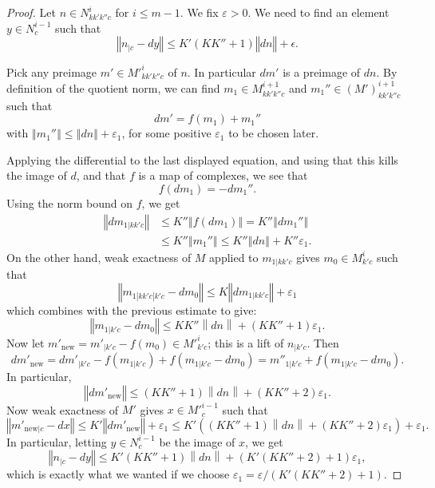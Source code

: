 \begin{proof}
\leanok
\def\ndn{\left\|dn\right\|}
Let $n \in N^i_{kk'k''c}$ for $i\leq m-1$.
We fix $ε > 0$. We need to find an element $y \in N^{i-1}_c$ such that
\[
  ‖n_{|c} - dy‖ \leq K'(KK'' + 1)‖dn‖ + \epsilon.
\]

Pick any preimage $m' \in M'^i_{kk'k''c}$ of $n$. In particular $dm'$ is
a preimage of $dn$.
By definition of the quotient norm,
we can find $m_1 ∈ M^{i+1}_{kk'k''c}$ and $m_1'' ∈ (M')^{i+1}_{kk'k''c}$ such that
\[
dm' = f(m_1) + m_1''
\]
with $‖m_1''‖ \leq ‖dn‖ + ε_1$, for some positive $ε_1$ to be chosen later.

Applying the differential to the last displayed equation, and using that this
kills the image of $d$, and that $f$ is a map of complexes, we see that
\[
f(dm_1) = -dm_1''.
\]
Using the norm bound on $f$, we get
\[\begin{aligned}
  ‖dm_{1|kk'c}‖ &≤ K''‖f(dm_1)‖ = K''‖dm_1''‖\\
                &≤ K''‖m_1''‖ ≤ K''‖dn‖ + K''ε_1.
\end{aligned}\]
On the other hand, weak exactness of $M$ applied to $m_{1|kk'c}$
gives $m_0 ∈ M^i_{k'c}$ such that
\[
  ‖m_{1|kk'c|k'c} - dm_0‖ \leq K‖dm_{1|kk'c}‖ + ε_1
\]
which combines with the previous estimate to give:
\[
  ‖m_{1|k'c} - dm_0‖ \leq K K'' \left\|d n\right\| + (KK'' + 1)ε_1.
\]
Now let $m'_{\mathrm{new}} = m'_{|k'c} - f(m_0) \in M'^i_{k'c}$; this is a lift of $n_{|k'c}$.
Then
\[
dm'_{\mathrm{new}} = dm'_{|k'c} - f(m_{1|k'c}) + f(m_{1|k'c} - dm_0) = m''_{1|k'c} + f(m_{1|k'c} - dm_0).
\]
In particular,
\[
‖dm'_{\mathrm{new}}‖ ≤ (KK'' + 1)\ndn + (KK'' + 2) ε_1.
\]
Now weak exactness of $M'$ gives $x \in M'^{i-1}_c$ such that
\[
  ‖m'_{\mathrm{new}|c} - dx‖ ≤ K'‖dm'_{\mathrm{new}}‖ + ε_1 \leq
    K'((K K'' + 1) \ndn + (KK'' + 2) ε_1) + ε_1.
\]
In particular, letting $y \in N^{i-1}_c$ be the image of $x$, we get
\[
  ‖n_{|c} - dy‖ ≤ K'(K K'' + 1)\ndn + (K'(K  K'' + 2) + 1) ε_1,
\]
which is exactly what we wanted if we choose
$ε_1 = ε/(K'(K  K'' + 2) + 1)$.
\end{proof}

